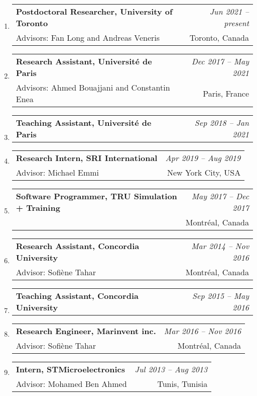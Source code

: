 \documentclass[10pt]{article}
\makeatletter
\newcommand{\lbar}[1]{{\color{#1}\ding{118}}\hspace*{2pt}}
\newenvironment{benumerate}[2]{
    \let\oldItem\item
    \def\item{\addtocounter{enumi}{-2}\oldItem}
    \begin{enumerate}[#2] \itemsep3pt
    \setcounter{enumi}{#1}
    \addtocounter{enumi}{1}}
  {\end{enumerate}}
\newcommand{\positionnodesc}[2]
{%
\item
  \begin{tabular*}{7.5in}{l@{\extracolsep{\fill}}r}
    \textbf{#1} & \textit{#2}
  \end{tabular*}
}
\newenvironment{position}[4]
{%
\item
  \begin{tabular*}{7.5in}{l@{\extracolsep{\fill}}r}
    \textbf{#1} & \textit{#2} \\
    \hspace{1ex} #3 & \small{#4} \\
  \end{tabular*}
  }
  { %
}
\newenvironment{region}[3]{%
  \vspace*{0.5ex}
  {\scalebox{1.4}{\textbf{#1}}}
  \begin{benumerate}{#3}{\color{RoyalBlue}#2}}
  {\end{benumerate}\vspace{0.8ex}}
\newenvironment{nonumregion}[1]{%
\begin{region}{#1}{}{1}}
{\end{region}}
\makeatother
\begin{document}
\begin{nonumregion} {\lbar{orange}Experience}
  \begin{position}{Postdoctoral Researcher, University of Toronto}{Jun 2021 -- present}
		{Advisors: Fan Long and Andreas Veneris}{Toronto, Canada}
  \end{position}
  \begin{position}{Research Assistant, Universit\'{e} de Paris}{Dec 2017 -- May 2021}
		{Advisors: Ahmed Bouajjani and Constantin Enea}{Paris, France}
  \end{position}
  \positionnodesc{Teaching Assistant, Universit\'{e} de Paris}{Sep 2018 -- Jan 2021}
  \begin{position}{Research Intern, SRI International}{Apr 2019 -- Aug 2019}
		{Advisor: Michael Emmi}{New York City, USA}
  \end{position}
  \begin{position}{Software Programmer, TRU Simulation + Training}{May 2017 -- Dec 2017}
      {}{Montr\'{e}al, Canada}
  \end{position}
  \begin{position}{Research Assistant, Concordia University}{Mar 2014 -- Nov 2016}
		{Advisor: Sofi\`{e}ne Tahar}{Montr\'{e}al, Canada}
  \end{position}
  \positionnodesc{Teaching Assistant, Concordia University}{Sep 2015 -- May 2016}
  \begin{position}{Research Engineer, Marinvent inc.}{Mar 2016 -- Nov 2016}
		{Advisor: Sofi\`{e}ne Tahar}{Montr\'{e}al, Canada}
  \end{position}
  
  \begin{position}{Intern, STMicroelectronics}{Jul 2013 -- Aug 2013}
    {Advisor: Mohamed Ben Ahmed}{Tunis, Tunisia}
  \end{position}


\end{nonumregion}
\end{document}
